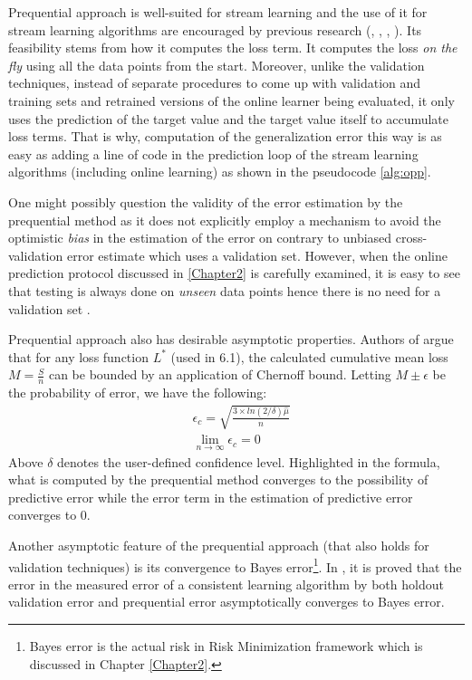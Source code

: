 Prequential approach is well-suited for stream learning and the use of it for stream learning algorithms are encouraged by previous research (\cite{ikonomovska_regression_2009}, \cite{vovk_-line_2009}, \cite{gama_issues_2009}, \cite{gama_evaluating_2013}). Its feasibility stems from how it computes the loss term. It computes the loss \textit{on the fly} using all the data points from the start. Moreover, unlike the validation techniques, instead of separate procedures to come up with validation and training sets and retrained versions of the online learner being evaluated, it only uses the prediction of the target value and the target value itself to accumulate loss terms. That is why, computation of the generalization error this way is as easy as adding a line of code in the prediction loop of the stream learning algorithms (including online learning) as shown in the pseudocode \ref{alg:opp}. 
%
%

One might possibly question the validity of the error estimation by the prequential method as it does not explicitly employ a mechanism to avoid the optimistic \textit{bias} in the estimation of the error on contrary to unbiased cross-validation error estimate which uses a validation set. However, when the online prediction protocol discussed in \ref{Chapter2} is carefully examined, it is easy to see that testing is always done on \textit{unseen} data points hence there is no need for a validation set \citep[p. 111]{lemaire_survey_2015}.

Prequential approach also has desirable asymptotic properties. Authors of \citep[p. 331]{gama_issues_2009} argue that for any loss function $L^*$ (used in 6.1), the calculated cumulative mean loss $M=\frac{S}{n}$ can be bounded by an application of Chernoff bound. Letting $M\pm \epsilon$ be the probability of error, we have the following: 
\begin{align*} 
& \epsilon_c = \sqrt{\frac{3\times{ln(2/\delta)}\hat{\mu}}{n}} \\
& \underset{n\rightarrow \infty} \lim {\epsilon_c} = 0
\end{align*} 
Above  $\delta$ denotes the user-defined confidence level. Highlighted in the formula, what is computed by the prequential method converges to the possibility of predictive error while the error term in the estimation of predictive error converges to $0$. 

Another asymptotic feature of the prequential approach (that also holds for validation techniques) is its convergence to Bayes error\footnote{Bayes error is the actual risk in Risk Minimization framework which is discussed in Chapter \ref{Chapter2}.}. In \citep[pp. 323-324]{gama_evaluating_2013}, it is proved that the error in the measured error of a consistent learning algorithm by both holdout validation error and prequential error asymptotically converges to Bayes error.

